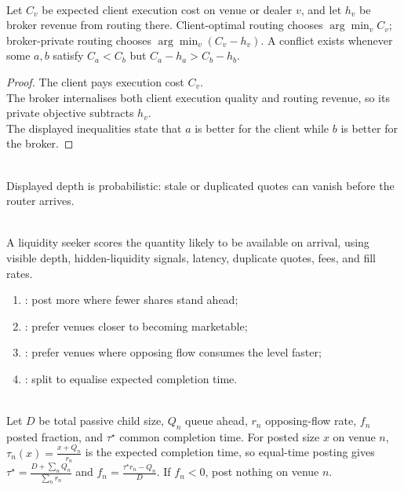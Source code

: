 \begin{proposition} \\
Let $C_v$ be expected client execution cost on venue or dealer $v$, and let $h_v$ be broker revenue from routing there. Client-optimal routing chooses $\arg\min_v C_v$; broker-private routing chooses $\arg\min_v(C_v-h_v)$. A conflict exists whenever some $a,b$ satisfy $C_a<C_b$ but $C_a-h_a>C_b-h_b$.
\begin{proof}
The client pays execution cost $C_v$.\\
The broker internalises both client execution quality and routing revenue, so its private objective subtracts $h_v$.\\
The displayed inequalities state that $a$ is better for the client while $b$ is better for the broker.
\end{proof}
\end{proposition}

\begin{caveat} \\
Displayed depth is probabilistic: stale or duplicated quotes can vanish before the router arrives.
\end{caveat}

\begin{principle} \\
A liquidity seeker scores the quantity likely to be available on arrival, using visible depth, hidden-liquidity signals, latency, duplicate quotes, fees, and fill rates.
\end{principle}

\begin{taxonomy} 
\begin{enumerate}[label=\roman*.]
\setlength{\itemsep}{0pt}
\item {}: post more where fewer shares stand ahead;
\item {}: prefer venues closer to becoming marketable;
\item {}: prefer venues where opposing flow consumes the level faster;
\item {}: split to equalise expected completion time.
\end{enumerate}
\end{taxonomy}

\begin{definition} \\
Let $D$ be total passive child size, $Q_n$ queue ahead, $r_n$ opposing-flow rate, $f_n$ posted fraction, and $\tau^\star$ common completion time. For posted size $x$ on venue $n$, $\tau_n(x)=\frac{x+Q_n}{r_n}$ is the expected completion time, so equal-time posting gives $\tau^\star=\frac{D+\sum_n Q_n}{\sum_n r_n}$ and $f_n=\frac{\tau^\star r_n-Q_n}{D}$. If $f_n<0$, post nothing on venue $n$.
\end{definition}

